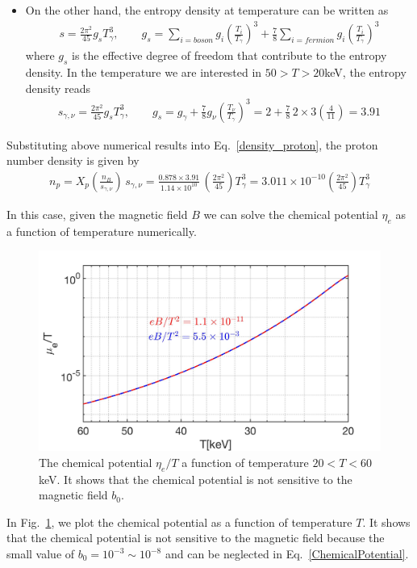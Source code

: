 \documentclass[Universe,article,submit,moreauthors,pdftex]{Definitions/mdpi}
\newcommand*{\req}[1]{Eq.~{\eqref{#1}}}
\newcommand*{\rf}[1]{Fig.~{\ref{#1}}}
\begin{document}
\begin{itemize}
  \item On the other hand, the entropy density at temperature can be written as \cite{Kolb:1990vq}
\begin{align}
s=\frac{2\pi^2}{45}g_sT_\gamma^3,\qquad g_s=\sum_{i=boson}g_i\left(\frac{T_i}{T_\gamma}\right)^3+\frac{7}{8}\sum_{i=fermion}g_i\left(\frac{T_i}{T_\gamma}\right)^3
\end{align}
where $g_s$ is the effective degree of freedom that contribute to the entropy density.  In the temperature we are interested in $50>T>20$keV, the entropy density reads
\begin{align}
s_{\gamma,\nu}=\frac{2\pi^2}{45}g_sT_\gamma^3,\qquad g_s=g_\gamma+\frac{7}{8}g_\nu\left(\frac{T_\nu}{T_\gamma}\right)^3=2+\frac{7}{8}\,2\times3\left(\frac{4}{11}\right)=3.91
\end{align}
\end{itemize}

Substituting above numerical results into \req{density_proton}, the proton number density is given by
\begin{align}
n_p= X_p\left(\frac{n_B}{s_{\gamma,\nu}}\right)\,s_{\gamma,\nu}=\frac{0.878\times3.91}{1.14\times10^{10}}\,\left(\frac{2\pi^2}{45}\right)T_\gamma^3=3.011\times10^{-10}\left(\frac{2\pi^2}{45}\right)T_\gamma^3
\end{align}

In this case, given the magnetic field $B$ we can solve the chemical potential $\eta_{e}$ as a function of temperature numerically.
\begin{figure}[h]
\centering
\includegraphics[width=0.75\linewidth]{./plots/ChemicalPotential_case1.jpg}
\caption{The chemical potential $\eta_{e}/T$ a function of temperature $20<T<60$keV.  It shows that the chemical potential is not sensitive to the magnetic field $b_0$.}
\label{chemical_fig} 
\end{figure}
In {\rf{chemical_fig}}, we plot the  chemical potential as a function of temperature $T$. It shows that the chemical potential is not sensitive to the magnetic field because the small value of $b_0=10^{-3}\sim10^{-8}$ and can be neglected in \req{ChemicalPotential}. 
\end{document}
